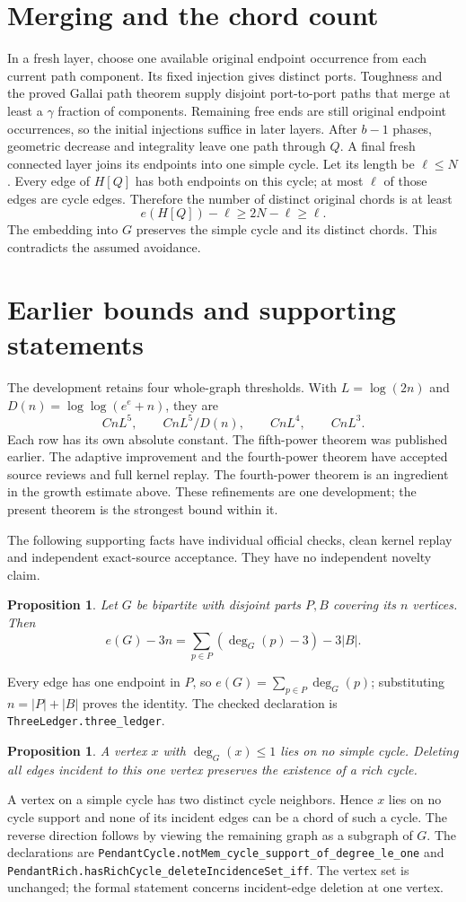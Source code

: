 \documentclass[11pt]{article}
\newtheorem{proposition}[theorem]{Proposition}
\begin{document}
\section{Merging and the chord count}
In a fresh layer, choose one available original endpoint occurrence from each current path component. Its fixed injection gives distinct ports. Toughness and the proved Gallai path theorem supply disjoint port-to-port paths that merge at least a $\gamma$ fraction of components. Remaining free ends are still original endpoint occurrences, so the initial injections suffice in later layers. After $b-1$ phases, geometric decrease and integrality leave one path through $Q$. A final fresh connected layer joins its endpoints into one simple cycle.
Let its length be $\ell\leq N$. Every edge of $H[Q]$ has both endpoints on this cycle; at most $\ell$ of those edges are cycle edges. Therefore the number of distinct original chords is at least
\[
 e(H[Q])-\ell\geq2N-\ell\geq\ell.
\]
The embedding into $G$ preserves the simple cycle and its distinct chords. This contradicts the assumed avoidance.
\section{Earlier bounds and supporting statements}
The development retains four whole-graph thresholds. With $L=\log(2n)$ and $D(n)=\log\log(e^e+n)$, they are
\[
 CnL^5,\qquad CnL^5/D(n),\qquad CnL^4,\qquad CnL^3.
\]
Each row has its own absolute constant. The fifth-power theorem was published earlier. The adaptive improvement and the fourth-power theorem have accepted source reviews and full kernel replay. The fourth-power theorem is an ingredient in the growth estimate above. These refinements are one development; the present theorem is the strongest bound within it.

The following supporting facts have individual official checks, clean kernel replay and independent exact-source acceptance. They have no independent novelty claim.

\begin{proposition}
Let $G$ be bipartite with disjoint parts $P,B$ covering its $n$ vertices. Then
\[
 e(G)-3n=\sum_{p\in P}(\deg_G(p)-3)-3|B|.
\]
\end{proposition}
Every edge has one endpoint in $P$, so $e(G)=\sum_{p\in P}\deg_G(p)$; substituting $n=|P|+|B|$ proves the identity. The checked declaration is \nolinkurl{ThreeLedger.three_ledger}.

\begin{proposition}
A vertex $x$ with $\deg_G(x)\le1$ lies on no simple cycle. Deleting all edges incident to this one vertex preserves the existence of a rich cycle.
\end{proposition}
A vertex on a simple cycle has two distinct cycle neighbors. Hence $x$ lies on no cycle support and none of its incident edges can be a chord of such a cycle. The reverse direction follows by viewing the remaining graph as a subgraph of $G$. The declarations are \nolinkurl{PendantCycle.notMem_cycle_support_of_degree_le_one} and \nolinkurl{PendantRich.hasRichCycle_deleteIncidenceSet_iff}. The vertex set is unchanged; the formal statement concerns incident-edge deletion at one vertex.
\end{document}
